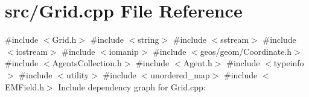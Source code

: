 \section{src/\+Grid.cpp File Reference}
\label{_grid_8cpp}
{\ttfamily \#include $<$Grid.\+h$>$}\newline
{\ttfamily \#include $<$string$>$}\newline
{\ttfamily \#include $<$sstream$>$}\newline
{\ttfamily \#include $<$iostream$>$}\newline
{\ttfamily \#include $<$iomanip$>$}\newline
{\ttfamily \#include $<$geos/geom/\+Coordinate.\+h$>$}\newline
{\ttfamily \#include $<$Agents\+Collection.\+h$>$}\newline
{\ttfamily \#include $<$Agent.\+h$>$}\newline
{\ttfamily \#include $<$typeinfo$>$}\newline
{\ttfamily \#include $<$utility$>$}\newline
{\ttfamily \#include $<$unordered\+\_\+map$>$}\newline
{\ttfamily \#include $<$E\+M\+Field.\+h$>$}\newline
Include dependency graph for Grid.\+cpp\+:
